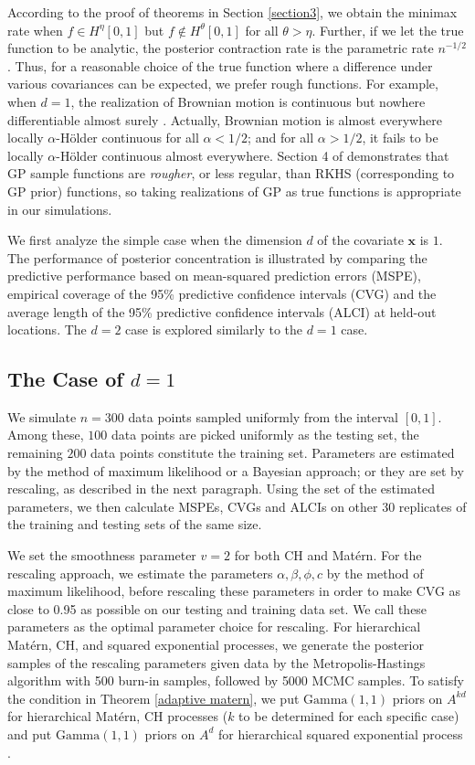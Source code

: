 \documentclass[ejs,noshowframe]{imsart}
\theoremstyle{plain}
\theoremstyle{definition}
\theoremstyle{remark}
\begin{document}
According to the proof of theorems in Section \ref{section3},  we obtain the minimax rate  when   $f \in H^{\eta}[0,1]$ but $f \notin H^{\theta}[0,1]$ for all $\theta>\eta$.  Further, if we let the true function to be analytic, the posterior  contraction rate is the parametric rate $n^{-1/2}$.  Thus, for a reasonable choice of the true function where a difference under various covariances can be expected, we prefer rough functions. For example, when $d=1$, the realization of  Brownian motion is continuous but 
nowhere differentiable almost surely \citep{morters2010brownian}. Actually, Brownian motion is almost everywhere locally
$\alpha$-H\"older continuous for all $\alpha<1/2$; and for all $\alpha>1/2$,   it fails to be locally $\alpha$-H\"older continuous almost everywhere.  Section 4 of  \cite{kanagawa2018gaussian}  demonstrates that   GP sample functions are \emph{rougher}, or less regular, than RKHS (corresponding to GP prior) functions,  so  taking  realizations of GP  as true functions  is appropriate in our simulations. 

We first analyze the simple case when the dimension $d$ of the covariate $\bm{x}$ is $1$. The performance of posterior concentration is illustrated by comparing    the  predictive performance  based on  mean-squared prediction errors (MSPE), empirical coverage of the 95\% predictive confidence intervals (CVG) and the average length of the 95\% predictive confidence intervals (ALCI) at held-out locations. The $d=2$ case is explored similarly to the $d=1$ case.


\subsection{The  Case of $d=1$}
We simulate $n=300$ data points sampled uniformly from the interval $[0,1]$.  Among these, $100$ data points  are picked uniformly as the testing set, the remaining $200$ data points constitute the training set. Parameters are estimated by the method of maximum likelihood or a Bayesian approach; or they are set by rescaling, as described in the next paragraph. Using the set of the estimated parameters, we then  calculate MSPEs, CVGs and ALCIs on other 30 replicates of the training and testing sets of the same size.  

We  set the smoothness parameter $v=2$  for both CH and Mat\'ern. For the rescaling approach, we estimate  the parameters  $\alpha,\beta,\phi,c$ by the method of maximum likelihood, before rescaling these parameters in order to make CVG as close to 0.95 as possible on our testing and training data set. We call these parameters as the optimal parameter choice for rescaling.  For  hierarchical Mat\'ern,  CH, and  squared exponential processes,  we generate the posterior samples of the rescaling parameters given data  by the Metropolis-Hastings algorithm \citep{chib1995understanding} with 500 burn-in samples, followed by {5000} MCMC samples. {To satisfy the condition in Theorem \ref{adaptive matern},  we put $\mathrm{Gamma}(1,1)$ priors on $A^{kd}$ for  hierarchical Mat\'ern,  CH processes ($k$ to be determined for each specific case) and   put $\mathrm{Gamma}(1,1)$ priors on $A^{d}$ for  hierarchical  squared exponential process \citep{van2009adaptive}.}
\end{document}
